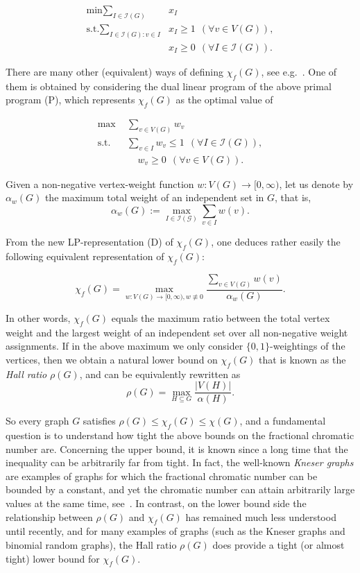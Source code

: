 \documentclass[a4paper,10pt]{amsart}
\begin{document}
\begin{align*}
\tag{P}
    \text{min} \sum_{I \in \mathcal{I}(G)}&{x_I} \\
    \text{s.t.} \sum_{I\in \mathcal{I}(G): v \in I}&{x_I}\ge 1~~(\forall v \in V(G)), \\
    & x_I \ge 0~~(\forall I \in \mathcal{I}(G)).
\end{align*}

There are many other (equivalent) ways of defining $\chi_f(G)$, see e.g.~\cite{scheinerman2011fractional}. One of them is obtained by considering the dual linear program of the above primal program (P), which represents $\chi_f(G)$ as the optimal value of 

\begin{align*}
\tag{D}
    \text{max} &\sum_{v\in V(G)}{w_v} \\
    \text{s.t.}~~~~&\sum_{v \in I}{w_v}\le 1~~(\forall I \in \mathcal{I}(G)), \\
    &~~~~~w_v \ge 0~~(\forall v\in V(G)).
\end{align*}

Given a non-negative vertex-weight function $w:V(G)\rightarrow [0,\infty)$, let us denote by $\alpha_w(G)$ the maximum total weight of an independent set in $G$, that is,
$$\alpha_w(G):=\max_{I \in \mathcal{I(G)}}\sum_{v\in I}w(v).$$

From the new LP-representation (D) of $\chi_f(G)$, one deduces rather easily the following equivalent representation of $\chi_f(G)$:

\begin{equation}
\tag{M} \chi_f(G)=\max_{w:V(G)\rightarrow [0,\infty), w \not\equiv 0}\frac{\sum_{v\in V(G)}{w(v)}}{\alpha_w(G)}.\end{equation}

In other words, $\chi_f(G)$ equals the maximum ratio between the total vertex weight and the largest weight of an independent set over all non-negative weight assignments. If in the above maximum we only consider $\{0,1\}$-weightings of the vertices, then we obtain a natural lower bound on $\chi_f(G)$ that is known as the \emph{Hall ratio} $\rho(G)$, and can be equivalently rewritten as 
$$\rho(G)=\max_{H\subseteq G}\frac{|V(H)|}{\alpha(H)}.$$

So every graph $G$ satisfies $\rho(G)\le \chi_f(G)\le \chi(G)$, and a fundamental question is to understand how tight the above bounds on the fractional chromatic number are. Concerning the upper bound, it is known since a long time that the inequality can be arbitrarily far from tight. In fact, the well-known \emph{Kneser graphs} are examples of graphs for which the fractional chromatic number can be bounded by a constant, and yet the chromatic number can attain arbitrarily large values at the same time, see~\cite{baranyi,lovasz,scheinerman2011fractional}. In contrast, on the lower bound side the relationship between $\rho(G)$ and $\chi_f(G)$ has remained much less understood until recently, and for many examples of graphs (such as the Kneser graphs and binomial random graphs), the Hall ratio $\rho(G)$ does provide a tight (or almost tight) lower bound for $\chi_f(G)$.
\end{document}
